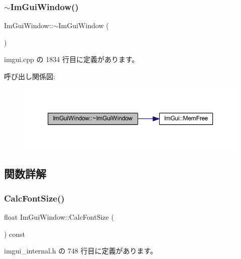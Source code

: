 \subsubsection{\texorpdfstring{$\sim$\+Im\+Gui\+Window()}{~ImGuiWindow()}}
{\footnotesize\ttfamily Im\+Gui\+Window\+::$\sim$\+Im\+Gui\+Window (\begin{DoxyParamCaption}{ }\end{DoxyParamCaption})}



 imgui.\+cpp の 1834 行目に定義があります。

呼び出し関係図\+:\nopagebreak
\begin{figure}[H]
\begin{center}
\leavevmode
\includegraphics[width=350pt]{struct_im_gui_window_a8e81d730c3a39a71e6b6ca4654451c53_cgraph}
\end{center}
\end{figure}


\subsection{関数詳解}
\mbox{\label{struct_im_gui_window_a6881ed65e208fb6e015d3ae6bccfc794}} 
\subsubsection{\texorpdfstring{Calc\+Font\+Size()}{CalcFontSize()}}
{\footnotesize\ttfamily float Im\+Gui\+Window\+::\+Calc\+Font\+Size (\begin{DoxyParamCaption}{ }\end{DoxyParamCaption}) const\hspace{0.3cm}{\ttfamily [inline]}}



 imgui\+\_\+internal.\+h の 748 行目に定義があります。

